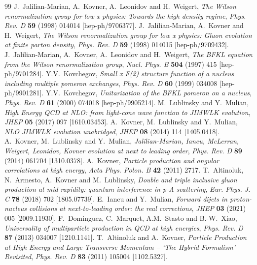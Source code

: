 \documentclass[11pt,a4paper]{article}
\numberwithin{equation}{section}
\begin{document}
\begin{thebibliography}{99}
 J.~Jalilian-Marian, A.~Kovner, A.~Leonidov and H.~Weigert, \emph{The Wilson renormalization group for low x physics: Towards the high density regime}, \emph{Phys. Rev. D} \textbf{59} (1998) 014014 [hep-ph/9706377].
 J.~Jalilian-Marian, A.~Kovner and H.~Weigert, \emph{The Wilson renormalization group for low x physics: Gluon evolution at finite parton density}, \emph{Phys. Rev. D} \textbf{59} (1998) 014015 [hep-ph/9709432].
 J.~Jalilian-Marian, A.~Kovner, A.~Leonidov and H.~Weigert, \emph{The BFKL equation from the Wilson renormalization group}, \emph{Nucl. Phys. B} \textbf{504} (1997) 415 [hep-ph/9701284].
 Y.V.~Kovchegov, \emph{Small x F(2) structure function of a nucleus including multiple pomeron exchanges}, \emph{Phys. Rev. D} \textbf{60} (1999) 034008 [hep-ph/9901281].
 Y.V.~Kovchegov, \emph{Unitarization of the BFKL pomeron on a nucleus}, \emph{Phys. Rev. D} \textbf{61} (2000) 074018 [hep-ph/9905214].
 M.~Lublinsky and Y.~Mulian, \emph{High Energy QCD at NLO: from light-cone wave function to JIMWLK evolution}, \emph{JHEP} \textbf{05} (2017) 097 [1610.03453].
 A.~Kovner, M.~Lublinsky and Y.~Mulian, \emph{NLO JIMWLK evolution unabridged}, \emph{JHEP} \textbf{08} (2014) 114 [1405.0418].
 A.~Kovner, M.~Lublinsky and Y.~Mulian, \emph{Jalilian-Marian, Iancu, McLerran, Weigert, Leonidov, Kovner evolution at next to leading order}, \emph{Phys. Rev. D} \textbf{89} (2014) 061704 [1310.0378].
 A.~Kovner, \emph{Particle production and angular correlations at high energy}, \emph{Acta Phys. Polon. B} \textbf{42} (2011) 2717.
 T.~Altinoluk, N.~Armesto, A.~Kovner and M.~Lublinsky, \emph{Double and triple inclusive gluon production at mid rapidity: quantum interference in p-A scattering}, \emph{Eur. Phys. J. C} \textbf{78} (2018) 702 [1805.07739].
 E.~Iancu and Y.~Mulian, \emph{Forward dijets in proton-nucleus collisions at next-to-leading order: the real corrections}, \emph{JHEP} \textbf{03} (2021) 005 [2009.11930].
 F.~Dominguez, C.~Marquet, A.M.~Stasto and B.-W.~Xiao, \emph{Universality of multiparticle production in QCD at high energies}, \emph{Phys. Rev. D} \textbf{87} (2013) 034007 [1210.1141].
 T.~Altinoluk and A.~Kovner, \emph{Particle Production at High Energy and Large Transverse Momentum -- `The Hybrid Formalism' Revisited}, \emph{Phys. Rev. D} \textbf{83} (2011) 105004 [1102.5327].

\end{thebibliography}
\end{document}
